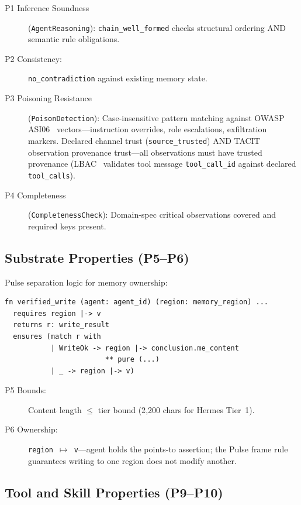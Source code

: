 \documentclass[sigplan,screen,nonacm]{acmart}
\newcommand{\pointsto}{\ensuremath{\mapsto}}
\begin{document}
\begin{description}
  \item[P1 Inference Soundness] (\texttt{AgentReasoning}):
    \texttt{chain\_well\_formed} checks structural ordering AND semantic rule
    obligations.
  \item[P2 Consistency:] \texttt{no\_contradiction} against existing memory
    state.
  \item[P3 Poisoning Resistance] (\texttt{PoisonDetection}):
    Case-insensitive pattern matching against OWASP
    ASI06~\cite{owasp2026asi06} vectors---instruction overrides, role
    escalations, exfiltration markers. Declared channel trust
    (\texttt{source\_trusted}) AND TACIT~\cite{odersky2026tacit}
    observation provenance trust---all observations must have trusted
    provenance (LBAC~\cite{zhou2026lbac} validates tool message
    \texttt{tool\_call\_id} against declared \texttt{tool\_calls}).
  \item[P4 Completeness] (\texttt{CompletenessCheck}): Domain-spec critical
    observations covered and required keys present.
\end{description}

\subsection{Substrate Properties (P5--P6)}

Pulse separation logic for memory ownership:

\begin{lstlisting}[language=fstar,caption={Verified write with Pulse separation logic postconditions.},label={lst:vwrite}]
fn verified_write (agent: agent_id) (region: memory_region) ...
  requires region |-> v
  returns r: write_result
  ensures (match r with
           | WriteOk -> region |-> conclusion.me_content
                        ** pure (...)
           | _ -> region |-> v)
\end{lstlisting}

\begin{description}
  \item[P5 Bounds:] Content length $\leq$ tier bound (2{,}200 chars for
    Hermes Tier~1).
  \item[P6 Ownership:] \texttt{region \pointsto{} v}---agent holds the
    points-to assertion; the Pulse frame rule guarantees writing to
    one region does not modify another.
\end{description}

\subsection{Tool and Skill Properties (P9--P10)}
\end{document}
